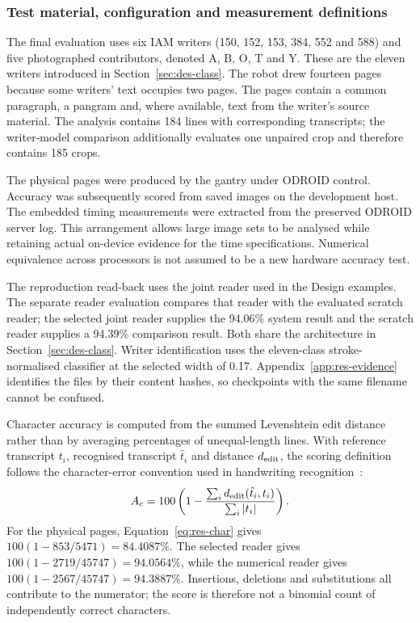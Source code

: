 \subsubsection{Test material, configuration and measurement definitions}
\label{sec:res-method}
The final evaluation uses six IAM writers (150, 152, 153, 384, 552 and 588) and five photographed contributors, denoted A, B, O, T and Y. These are the eleven writers introduced in Section~\ref{sec:des-class}. The robot drew fourteen pages because some writers' text occupies two pages. The pages contain a common paragraph, a pangram and, where available, text from the writer's source material. The analysis contains 184 lines with corresponding transcripts; the writer-model comparison additionally evaluates one unpaired crop and therefore contains 185 crops.

The physical pages were produced by the gantry under ODROID control. Accuracy was subsequently scored from saved images on the development host. The embedded timing measurements were extracted from the preserved ODROID server log. This arrangement allows large image sets to be analysed while retaining actual on-device evidence for the time specifications. Numerical equivalence across processors is not assumed to be a new hardware accuracy test.

The reproduction read-back uses the joint reader used in the Design examples. The separate reader evaluation compares that reader with the evaluated scratch reader; the selected joint reader supplies the 94.06\% system result and the scratch reader supplies a 94.39\% comparison result. Both share the architecture in Section~\ref{sec:des-class}. Writer identification uses the eleven-class stroke-normalised classifier at the selected width of 0.17. Appendix~\ref{app:res-evidence} identifies the files by their content hashes, so checkpoints with the same filename cannot be confused.

Character accuracy is computed from the summed Levenshtein edit distance rather than by averaging percentages of unequal-length lines. With reference transcript $t_i$, recognised transcript $\hat t_i$ and distance $d_{\rm edit}$, the scoring definition follows the character-error convention used in handwriting recognition~\cite[p.~2]{graves2006}:
\begin{equation}
A_c=100\left(1-\frac{\sum_i d_{\rm edit}(\hat t_i,t_i)}{\sum_i|t_i|}\right).
\label{eq:res-char}
\end{equation}
For the physical pages, Equation~\ref{eq:res-char} gives $100(1-853/5471)=84.4087\%$. The selected reader gives $100(1-2719/45747)=94.0564\%$, while the numerical reader gives $100(1-2567/45747)=94.3887\%$. Insertions, deletions and substitutions all contribute to the numerator; the score is therefore not a binomial count of independently correct characters.

